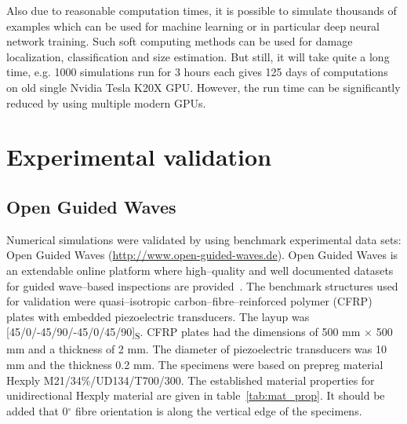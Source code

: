 \documentclass[12pt]{iopart}
\begin{document}
Also due to reasonable computation times, it is possible to simulate thousands of examples which can be used for machine learning or in particular deep neural network training. Such soft computing methods can be used for damage localization, classification and size estimation. But still, it will take quite a long time, e.g. 1000 simulations run for 3 hours each gives 125 days of computations on old single Nvidia Tesla K20X GPU. However, the run time can be significantly reduced by using multiple modern GPUs.

\section{Experimental validation}
\subsection{Open Guided Waves \label{sec:ogw}}
Numerical simulations were validated by using benchmark experimental data sets: Open Guided Waves (\url{http://www.open-guided-waves.de}). Open Guided Waves is an extendable online platform where high--quality and well documented datasets for guided wave--based inspections are provided~\cite{Moll2018}. The benchmark structures used for validation were quasi--isotropic carbon--fibre--reinforced polymer (CFRP) plates with embedded piezoelectric transducers. The layup was [45/0/-45/90/-45/0/45/90]\textsubscript{S}. CFRP plates had the dimensions of 500 mm $\times$ 500 mm and a thickness of 2 mm. The diameter of piezoelectric transducers was 10 mm and the thickness 0.2 mm. The specimens were based on prepreg material Hexply\textsuperscript{\textregistered} M21/34\%/UD134/T700/300. The established material properties for unidirectional Hexply material are given in table~\ref{tab:mat_prop}. It should be added that 0$^{\circ}$ fibre orientation is along the vertical edge of the specimens.
\end{document}
